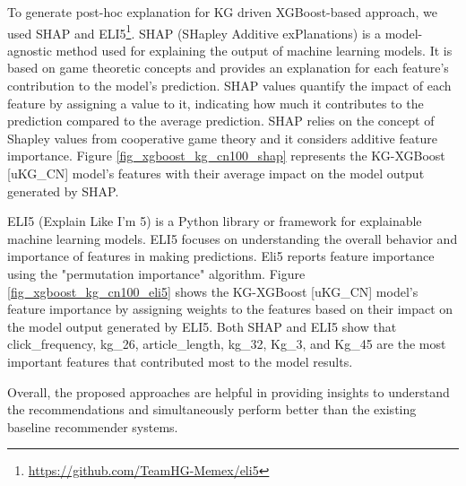 \documentclass[11pt]{article}
\begin{document}
To generate post-hoc explanation for KG driven XGBoost-based approach, we used SHAP \cite{NIPS2017_7062} and ELI5\footnote{\url{https://github.com/TeamHG-Memex/eli5}}. SHAP (SHapley Additive exPlanations) is a model-agnostic method used for explaining the output of machine learning models. It is based on game theoretic concepts and provides an explanation for each feature's contribution to the model's prediction. SHAP values quantify the impact of each feature by assigning a value to it, indicating how much it contributes to the prediction compared to the average prediction. SHAP relies on the concept of Shapley values from cooperative game theory and it considers additive feature importance.
Figure \ref{fig_xgboost_kg_cn100_shap} represents the KG-XGBoost [uKG\_CN] model's features with their average impact on the model output generated by SHAP. 

ELI5 (Explain Like I'm 5) is a Python library or framework for explainable machine learning models. ELI5 focuses on understanding the overall behavior and importance of features in making predictions. Eli5 reports feature importance using the "permutation importance" algorithm. Figure \ref{fig_xgboost_kg_cn100_eli5} shows the KG-XGBoost [uKG\_CN] model's feature importance by assigning weights to the features based on their impact on the model output generated by ELI5. Both SHAP and ELI5 show that click\_frequency, kg\_26, article\_length, kg\_32, Kg\_3, and Kg\_45 are the most important features that contributed most to the model results.

Overall, the proposed approaches are helpful in providing insights to understand the recommendations and simultaneously perform better than the existing baseline recommender systems.












\end{document}
